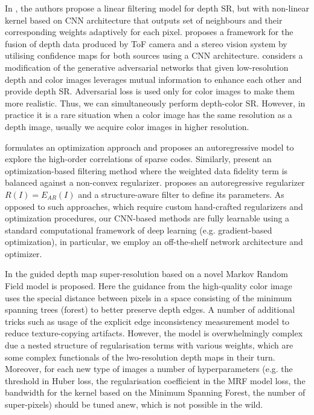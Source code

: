 In \cite{kim2018deformable}, the authors propose a linear filtering model for depth SR, but with non-linear kernel based on CNN architecture that outputs set of neighbours and their corresponding weights adaptively for each pixel.  \cite{agresti2017deep} proposes a framework for the fusion of depth data produced by ToF camera and a stereo vision system by utilising confidence maps for both sources using a CNN architecture. \cite{zhao2017simultaneously} considers a modification of the generative adversarial networks that given low-resolution depth and color images leverages mutual information to enhance each other and provide depth SR. Adversarial loss is used only for color images to make them more realistic. Thus, we can simultaneously perform depth-color SR. However, in practice it is a rare situation when a color image has the same resolution as a depth image, usually we acquire color images in higher resolution.

\cite{jiang2018depth} formulates an optimization approach and proposes an autoregressive model to explore the high-order correlations of sparse codes. Similarly, \cite{ham2018robust} present an optimization-based filtering method where the weighted data fidelity term is balanced against a non-convex regularizer. \cite{yang2014color} proposes an autoregressive regularizer $R(I) = E_{AR}(I)$ and a structure-aware filter to define its parameters. As opposed to such approaches, which require custom hand-crafted regularizers and optimization procedures, our CNN-based methods are fully learnable using a standard computational framework of deep learning (e.g. gradient-based optimization), in particular, we employ an off-the-shelf network architecture and optimizer. 

In \cite{zuo2018minimum} the guided depth map super-resolution based on a novel Markov Random Field model is proposed. Here the guidance from the high-quality color image uses the special distance between pixels in a space consisting of the minimum spanning trees (forest) to better preserve depth edges. A number of additional tricks such as usage of the explicit edge inconsistency measurement model to reduce texture-copying artifacts. However, the model is overwhelmingly complex due a nested structure of regularisation terms with various weights, which are some complex functionals of the lwo-resolution depth maps in their turn. Moreover, for each new type of images a number of hyperparameters (e.g. the threshold in Huber loss, the regularisation coefficient in the MRF model loss, the bandwidth for the kernel based on the Minimum Spanning Forest, the number of super-pixels) should be tuned anew, which is not possible in the wild.



